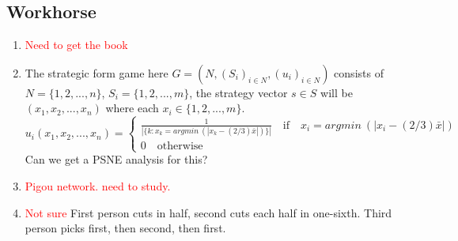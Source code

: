 \documentclass{article}
\begin{document}
\subsection{Workhorse}
\begin{enumerate}
	\item \textcolor{red}{Need to get the book}
	\item The strategic form game here $G = (N, (S_i)_{i \in N}, (u_i)_{i \in N})$ consists of $N = \{1,2, ..., n\}$, $S_i = \{1,2, ..., m\}$, the strategy vector $s \in S$ will be $(x_1, x_2, ..., x_n)$ where each $x_i \in \{1,2, ..., m\}$.
	\[
		u_i(x_1, x_2, ..., x_n) = 
		\begin{cases}
			\frac{1}{|\{k: x_k = argmin~(|x_k - (2/3)\bar{x}|)\}|} \quad \text{if} \quad x_i = argmin~(|x_i - (2/3)\bar{x}|)\\
			0 \quad \text{otherwise}
		\end{cases}
	\]
	Can we get a PSNE analysis for this?
	\item \textcolor{red}{Pigou network. need to study.}
	\item \textcolor{red}{Not sure} First person cuts in half, second cuts each half in one-sixth. Third person picks first, then second, then first.
\end{enumerate}
	
	
\end{document}
